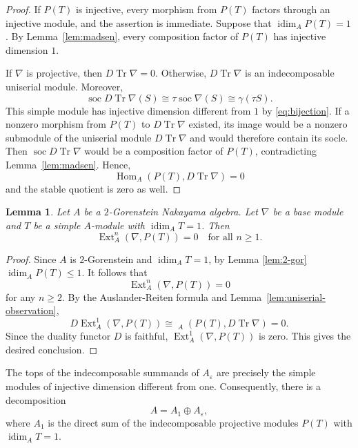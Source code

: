 \documentclass[a4paper,reqno]{amsart}
\numberwithin{equation}{section}
\theoremstyle{plain}
\newtheorem{lem}[thm]{Lemma}
\theoremstyle{definition}
\theoremstyle{remark}
\DeclareMathOperator{\Hom}{Hom}
\DeclareMathOperator{\Ext}{Ext}
\DeclareMathOperator{\oHom}{\overline{Hom}}
\DeclareMathOperator{\soc}{soc}
\DeclareMathOperator{\idim}{idim}
\DeclareMathOperator{\Tr}{Tr}
\renewcommand{\-}{\mbox{-}}
\begin{document}
\begin{proof}
If \(P(T)\) is injective, 
every morphism from \(P(T)\)  factors through an injective module, 
and the assertion is immediate.
Suppose that \(\idim_AP(T)=1\). 
By Lemma~\ref{lem:madsen},
every composition factor of \(P(T)\) has injective dimension \(1\).

If \(\nabla\) is projective, then \(D \Tr\nabla = 0\). 
Otherwise, \(D \Tr\nabla\) is an indecomposable
uniserial module. Moreover,
\[\soc D\Tr \nabla(S)\cong \tau\soc \nabla(S)\cong\gamma(\tau S).\]
This simple module has injective dimension different from \(1\) 
by \eqref{eq:bijection}.
If a nonzero morphism from $P(T)$ to $D\Tr\nabla$ existed, its image
would be a nonzero submodule of the uniserial module $D\Tr\nabla$ and would
therefore contain its socle. Then $\soc D\Tr\nabla$ would be a composition factor
of $P(T)$, contradicting Lemma~\ref{lem:madsen}. Hence,
\[\Hom_A(P(T),D\Tr\nabla)=0\] 
and the stable quotient is zero as well.
\end{proof}

\begin{lem} \label{lem:ext-van}
Let \(A\) be a \(2\)-Gorenstein Nakayama algebra.
Let \(\nabla\) be a base module and \(T\) be a simple \(A\)-module 
with \(\idim_AT=1\). Then 
\begin{equation*}
    \Ext_A^n(\nabla,P(T))= 0 \quad \text{for all } n\ge 1.
\end{equation*}
\end{lem}


\begin{proof}
Since \(A\) is \(2\)-Gorenstein and \(\idim_AT=1\), 
by Lemma \ref{lem:2-gor}  \(\idim_AP(T)\leq 1\). 
It follows that
\begin{equation*}
    \Ext_A^n(\nabla,P(T)) = 0 
\end{equation*}
for any \(n\ge 2\).
By the Auslander-Reiten formula and Lemma~\ref{lem:uniserial-observation},
\begin{equation*}
    D\Ext_A^1(\nabla,P(T))\cong \oHom_A(P(T),D\Tr\nabla)=0.
\end{equation*}
Since the  duality functor $D$ is faithful, 
$\Ext_A^1(\nabla,P(T))$ is zero.
This gives the desired conclusion.
\end{proof}




The tops of the indecomposable summands of $A_\varepsilon$ are precisely the
simple modules of injective dimension different from one. Consequently, there is
a decomposition
\begin{equation}\label{eq:A-decomposition}
  A=A_1\oplus A_\varepsilon,
\end{equation}
where $A_1$ is the direct sum of the indecomposable projective modules $P(T)$
with $\idim_AT=1$.
\end{document}
